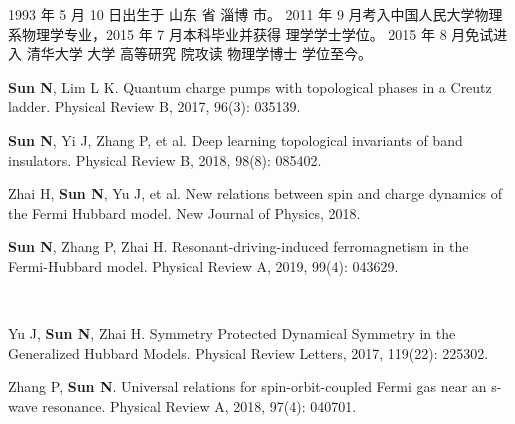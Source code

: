 \begin{resume}


    1993 年 5 月 10 日出生于 山东 省 淄博 市。
    2011 年 9 月考入中国人民大学物理系物理学专业，2015 年 7 月本科毕业并获得
    理学学士学位。
    2015 年 8 月免试进入 清华大学 大学 高等研究 院攻读 物理学博士 学位至今。


    \begin{publications}
        \item \textbf{Sun N}, Lim L K. Quantum charge pumps with topological phases in 
            a Creutz ladder. Physical Review B, 2017, 96(3): 035139.
        \item \textbf{Sun N}, Yi J, Zhang P, et al. Deep learning topological invariants 
            of band insulators. Physical Review B, 2018, 98(8): 085402.
        \item Zhai H, \textbf{Sun N}, Yu J, et al. New relations between spin and charge 
            dynamics of the Fermi Hubbard model. New Journal of Physics, 
            2018.
        \item \textbf{Sun N}, Zhang P, Zhai H. Resonant-driving-induced ferromagnetism in the Fermi-Hubbard model. Physical Review A, 2019, 99(4): 043629.
    \end{publications}
    ~


    \begin{publications}
        \item Yu J, \textbf{Sun N}, Zhai H. Symmetry Protected Dynamical Symmetry in 
        the Generalized Hubbard Models. Physical Review Letters, 2017, 119(22): 225302.
        \item Zhang P, \textbf{Sun N}. Universal relations for spin-orbit-coupled 
        Fermi gas near an s-wave resonance. Physical Review A, 2018, 97(4): 040701.
    \end{publications}

\end{resume}
